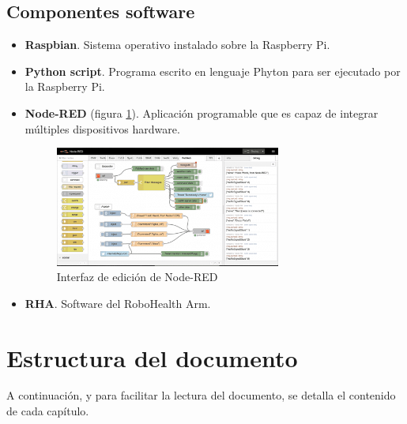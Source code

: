 \subsection{Componentes software}
\begin{itemize}
\item \textbf{Raspbian}. Sistema operativo instalado sobre la Raspberry Pi.
\item \textbf{Python script}. Programa escrito en lenguaje Phyton para ser ejecutado por la Raspberry Pi.
\item \textbf{Node-RED} (figura \ref{fig:NodeRED}). Aplicación programable que es capaz de integrar múltiples dispositivos hardware.

\begin{figure}[H]
\centering
\includegraphics[width=0.7\textwidth]{figuras/NodeRED.png}
\caption{Interfaz de edición de Node-RED}
\label{fig:NodeRED}
\end{figure}

\item \textbf{RHA}. Software del RoboHealth Arm.

\end{itemize}

\section{Estructura del documento}

A continuación, y para facilitar la lectura del documento, se detalla el contenido de cada capítulo.

